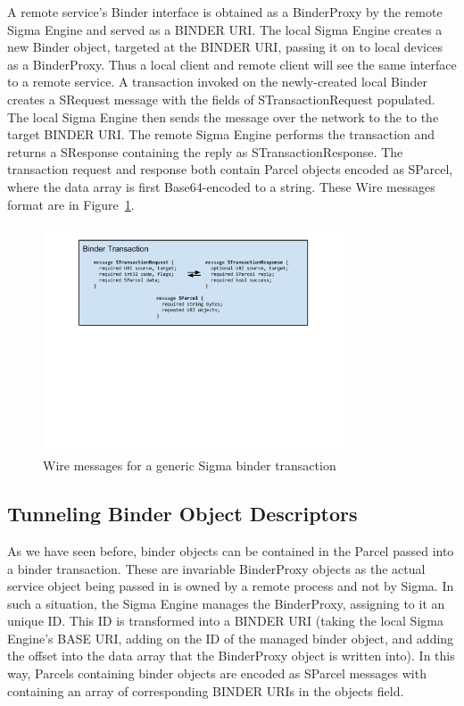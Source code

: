 \documentclass[prodmode]{acmlarge}
\begin{document}
A remote service's Binder interface is obtained as a BinderProxy by the remote Sigma Engine and served as a BINDER URI. The local Sigma Engine creates a new Binder object, targeted at the BINDER URI, passing it on to local devices as a BinderProxy. Thus a local client and remote client will see the same interface to a remote service. A transaction invoked on the newly-created local Binder creates a SRequest message with the fields of STransactionRequest populated. The local Sigma Engine then sends the message over the network to the to the target BINDER URI. The remote Sigma Engine performs the transaction and returns a SResponse containing the reply as STransactionResponse. The transaction request and response both contain Parcel objects encoded as SParcel, where the data array is first Base64-encoded to a string. These Wire messages format are in Figure~\ref{fig:GenericSigmaBinderTransaction}.

\begin{figure}[h!]
\centering
\includegraphics[width=0.8\textwidth]{drawings/WireBinderTransaction.pdf}
\caption{Wire messages for a generic Sigma binder transaction}
\label{fig:GenericSigmaBinderTransaction}
\end{figure}

\subsection{Tunneling Binder Object Descriptors}
As we have seen before, binder objects can be contained in the Parcel passed into a binder transaction. These are invariable BinderProxy objects as the actual service object being passed in is owned by a remote process and not by Sigma. In such a situation, the Sigma Engine manages the BinderProxy, assigning to it an unique ID. This ID is transformed into a BINDER URI (taking the local Sigma Engine's BASE URI, adding on the ID of the managed binder object, and adding the offset into the data array that the BinderProxy object is written into). In this way, Parcels containing binder objects are encoded as SParcel messages with containing an array of corresponding BINDER URIs in the objects field.
\end{document}
